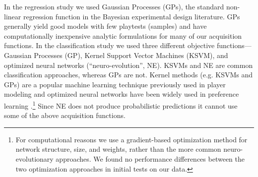 \documentclass{sig-alternate}
\begin{document}
In the regression study we used Gaussian Processes (GPs), the standard non-linear regression function in the Bayesian experimental design literature.
GPs generally yield good models with few playtests (samples) and have computationally inexpensive analytic formulations for many of our acquisition functions.
In the classification study we used three different objective functions---Gaussian Processes (GP), Kernel Support Vector Machines (KSVM), and optimized neural networks (``neuro-evolution'', NE).
KSVMs and NE are common classification approaches, whereas GPs are not.
Kernel methods (e.g. KSVMs and GPs) are a popular machine learning technique previously used in player modeling \cite{yu2011:minboredom} and optimized neural networks have been widely used in preference learning \cite{yannakakis2011:edpcg}.\footnote{For computational reasons we use a gradient-based optimization method for network structure, size, and weights, rather than the more common neuro-evolutionary approaches. 
We found no performance differences between the two optimization approaches in initial tests on our data.}
Since NE does not produce probabilistic predictions it cannot use some of the above acquisition functions.




%
\end{document}
